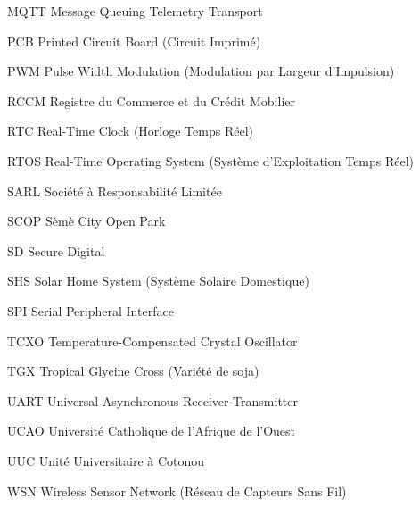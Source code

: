 \begin{sigleslist}
    \item[MQTT] Message Queuing Telemetry Transport
    \item[PCB] Printed Circuit Board (Circuit Imprimé)
    \item[PWM] Pulse Width Modulation (Modulation par Largeur d'Impulsion)
    \item[RCCM] Registre du Commerce et du Crédit Mobilier
    \item[RTC] Real-Time Clock (Horloge Temps Réel)
    \item[RTOS] Real-Time Operating System (Système d'Exploitation Temps Réel)
    \item[SARL] Société à Responsabilité Limitée
    \item[SCOP] Sèmè City Open Park
    \item[SD] Secure Digital
    \item[SHS] Solar Home System (Système Solaire Domestique)
    \item[SPI] Serial Peripheral Interface
    \item[TCXO] Temperature-Compensated Crystal Oscillator
    \item[TGX] Tropical Glycine Cross (Variété de soja)
    \item[UART] Universal Asynchronous Receiver-Transmitter
    \item[UCAO] Université Catholique de l'Afrique de l'Ouest
    \item[UUC] Unité Universitaire à Cotonou
    \item[WSN] Wireless Sensor Network (Réseau de Capteurs Sans Fil)
\end{sigleslist}

